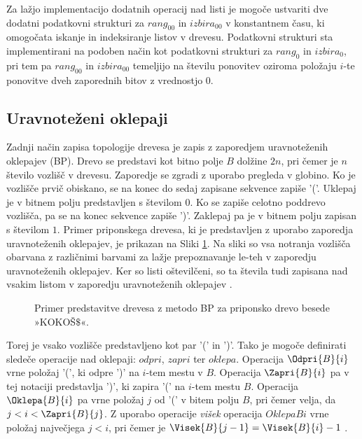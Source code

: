 Za lažjo implementacijo dodatnih operacij nad listi je mogoče ustvariti dve dodatni podatkovni strukturi za $rang_{00}$ in $izbira_{00}$ v konstantnem času, ki omogočata iskanje in indeksiranje listov v drevesu. Podatkovni strukturi sta implementirani na podoben način kot podatkovni strukturi za $rang_0$ in $izbira_0$, pri tem pa $rang_{00}$ in $izbira_{00}$ temeljijo na številu ponovitev oziroma položaju $i$-te ponovitve dveh zaporednih bitov z vrednostjo 0.

\subsection{Uravnoteženi oklepaji}\label{sec:oklepaji}

Zadnji način zapisa topologije drevesa je zapis z zaporedjem uravnoteženih oklepajev (BP). Drevo se predstavi kot bitno polje $B$ dolžine $2n$, pri čemer je $n$ število vozlišč v drevesu. Zaporedje se zgradi z uporabo pregleda v globino. Ko je vozlišče prvič obiskano, se na konec do sedaj zapisane sekvence zapiše '('. Uklepaj je v bitnem polju predstavljen s številom $0$. Ko se zapiše celotno poddrevo vozlišča, pa se na konec sekvence zapiše ')'. Zaklepaj pa je v bitnem polju zapisan s številom $1$. Primer priponskega drevesa, ki je predstavljen z uporabo zaporedja uravnoteženih oklepajev, je prikazan na Sliki \ref{fig:BP}. Na sliki so vsa notranja vozlišča obarvana z različnimi barvami za lažje prepoznavanje le-teh v zaporedju uravnoteženih oklepajev. Ker so listi oštevilčeni, so ta števila tudi zapisana nad vsakim listom v zaporedju uravnoteženih oklepajev \cite{Navarro2016}.

\begin{figure}[htb]
    \begin{center}
        
        \caption{Primer predstavitve drevesa z metodo BP za priponsko drevo besede »KOKOŠ$\$$«.} 
        \label{fig:BP}
    \end{center}
\end{figure}

Torej je vsako vozlišče predstavljeno kot par '(' in ')'. Tako je mogoče definirati sledeče operacije nad oklepaji: $odpri$, $zapri$ ter $oklepa$. Operacija $\Odpri{B}{i}$ vrne položaj '(', ki odpre ')' na $i$-tem mestu v $B$. Operacija $\Zapri{B}{i}$ pa v tej notaciji predstavlja ')', ki zapira '(' na $i$-tem mestu $B$. Operacija $\Oklepa{B}{i}$ pa vrne položaj $j$ od '(' v bitem polju $B$, pri čemer velja, da $j<i<\Zapri{B}{j}$. Z uporabo operacije \textit{višek} operacija $Oklepa{B}{i}$ vrne položaj največjega $j<i$, pri čemer je $\Visek{B}{j-1}=\Visek{B}{i}-1$ \cite{Navarro2016}.


